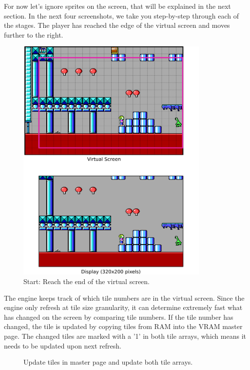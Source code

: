 \documentclass[book.tex]{subfiles}
\begin{document}
For now let's ignore sprites on the screen, that will be explained in the next section. In the next four screenshots, we take you step-by-step through each of the stages. The player has reached the edge of the virtual screen and moves further to the right. \\
 
\begin{figure}[H]
\centering
 \includegraphics[width=0.85\textwidth]{screenshots_300dpi/game/Keen_ATR_1-3_a.png}
 \caption{Start: Reach the end of the virtual screen.}
 \label{fig:kc1_3_start}
\end{figure}

\pagebreak
The engine keeps track of which tile numbers are in the virtual screen. Since the engine only refresh at tile size granularity, it can determine extremely fast what has changed on the screen by comparing tile numbers. If the tile number has changed, the tile is updated by copying tiles from RAM into the VRAM master page. The changed tiles are marked with a '1' in both tile arrays, which means it needs to be updated upon next refresh.

\begin{figure}[H]
\centering
 \caption{Update tiles in master page and update both tile arrays.}
 \label{fig:kc1_3_step1}
\end{figure}
\end{document}
